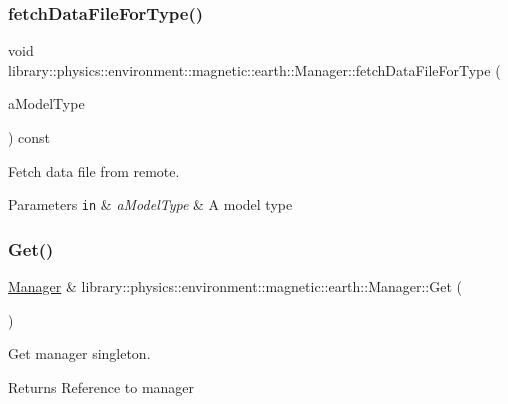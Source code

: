 \subsubsection{\texorpdfstring{fetch\+Data\+File\+For\+Type()}{fetchDataFileForType()}}
{\footnotesize\ttfamily void library\+::physics\+::environment\+::magnetic\+::earth\+::\+Manager\+::fetch\+Data\+File\+For\+Type (\begin{DoxyParamCaption}\item[{const \hyperlink{classlibrary_1_1physics_1_1environment_1_1magnetic_1_1_earth_ab9d257d23aa5899a3ef36c7dec62ef72}{Earth\+Magnetic\+Model\+::\+Type} \&}]{a\+Model\+Type }\end{DoxyParamCaption}) const}



Fetch data file from remote. 


\begin{DoxyParams}[1]{Parameters}
\mbox{\tt in}  & {\em a\+Model\+Type} & A model type \\
\hline
\end{DoxyParams}
\mbox{\label{classlibrary_1_1physics_1_1environment_1_1magnetic_1_1earth_1_1_manager_a61dcc0186b95a95dfdbec9bf1e285c5a}} 
\subsubsection{\texorpdfstring{Get()}{Get()}}
{\footnotesize\ttfamily \hyperlink{classlibrary_1_1physics_1_1environment_1_1magnetic_1_1earth_1_1_manager}{Manager} \& library\+::physics\+::environment\+::magnetic\+::earth\+::\+Manager\+::\+Get (\begin{DoxyParamCaption}{ }\end{DoxyParamCaption})\hspace{0.3cm}{\ttfamily [static]}}



Get manager singleton. 

\begin{DoxyReturn}{Returns}
Reference to manager 
\end{DoxyReturn}
\mbox{\label{classlibrary_1_1physics_1_1environment_1_1magnetic_1_1earth_1_1_manager_a39ef95997e959ff2d74e3b8c4ac8ff7d}} 
